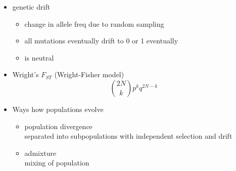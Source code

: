 \documentclass[font=12pt]{article}
\begin{document}
\begin{itemize}
\begin{itemize}
	\end{itemize}
	\item genetic drift
	\begin{itemize}
		\item change in allele freq due to random sampling
		\item all mutations eventually drift to 0 or 1 eventually
		\item is neutral
	\end{itemize}
	\item Wright's $ F_{ST} $ (Wright-Fisher model)\\
	\[ {{2N}\choose{k}} p^k q^{2N-k} \]
	\item Ways how populations evolve
	\begin{itemize}
		\item population divergence\\
		separated into subpopulations with independent selection and drift
		\item admixture\\
		mixing of population
	\end{itemize}
\end{itemize}
\end{document}
